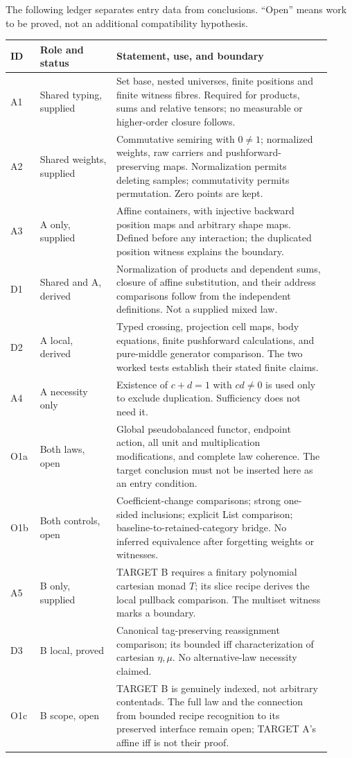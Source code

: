 \documentclass[11pt,a4paper]{article}
\begin{document}
The following ledger separates entry data from conclusions. ``Open'' means
work to be proved, not an additional compatibility hypothesis.
\begin{longtable}{@{}p{0.08\linewidth}p{0.22\linewidth}p{0.62\linewidth}@{}}
\toprule
ID & Role and status & Statement, use, and boundary \\
\midrule
\endhead
A1 & Shared typing, supplied & Set base, nested universes, finite positions and
finite witness fibres. Required for products, sums and relative tensors;
no measurable or higher-order closure follows. \\
A2 & Shared weights, supplied & Commutative semiring with $0\ne1$; normalized
weights, raw carriers and pushforward-preserving maps. Normalization permits
deleting samples; commutativity permits permutation. Zero points are kept. \\
A3 & A only, supplied & Affine containers, with injective backward position
maps and arbitrary shape maps. Defined before any interaction; the duplicated
position witness explains the boundary. \\
D1 & Shared and A, derived & Normalization of products and dependent
sums, closure of affine substitution, and their address comparisons follow
from the independent definitions. Not a supplied mixed law. \\
D2 & A local, derived & Typed crossing, projection cell maps,
body equations, finite pushforward calculations, and pure-middle generator
comparison. The two worked tests establish their stated finite claims. \\
A4 & A necessity only & Existence of $c+d=1$ with $cd\ne0$ is used
only to exclude duplication. Sufficiency does not need it. \\
O1a & Both laws, open & Global pseudobalanced functor, endpoint action,
all unit and multiplication modifications, and complete law coherence.
The target conclusion must not be inserted here as an entry condition. \\
O1b & Both controls, open & Coefficient-change comparisons; strong one-sided
inclusions; explicit List comparison; baseline-to-retained-category bridge.
No inferred equivalence after forgetting weights or witnesses. \\
A5 & B only, supplied & TARGET B requires a finitary polynomial cartesian monad $T$; its slice recipe derives the local pullback comparison. The multiset witness marks a boundary. \\ 
D3 & B local, proved & Canonical tag-preserving reassignment comparison; its bounded iff characterization of cartesian $\eta,\mu$. No alternative-law necessity claimed. \\
O1c & B scope, open & TARGET B is genuinely indexed, not arbitrary contentads.
The full law and the connection from bounded recipe recognition to its
preserved interface remain open; TARGET A's affine iff is not their proof. \\
\bottomrule
\end{longtable}
\end{document}
